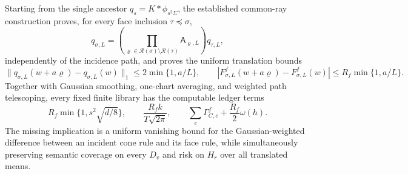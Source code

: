 Starting from the single ancestor \(q_s=K*\phi_{s^2\Sigma}\), the established
common-ray construction proves, for every face inclusion
\(\tau\preceq\sigma\),
\[
 q_{\sigma,L}=
 \left(\prod_{\varrho\in\mathscr R(\sigma)\setminus\mathscr R(\tau)}
 \mathsf A_{\varrho,L}\right)q_{\tau,L},
\]
independently of the incidence path, and proves the uniform translation
bounds
\[
 \|q_{\sigma,L}(w+a\varrho)-q_{\sigma,L}(w)\|_1
 \leq2\min\{1,a/L\},
 \qquad
 |F^f_{\sigma,L}(w+a\varrho)-F^f_{\sigma,L}(w)|
 \leq R_f\min\{1,a/L\}.
\]
Together with Gaussian smoothing, one-chart averaging, and weighted path
telescoping, every fixed finite library has the computable ledger terms
\[
 R_f\min\{1,s^2\sqrt{d/8}\},\qquad
 \frac{R_fk}{T\sqrt{2\pi}},\qquad
 \sum_e\Gamma_{C,e}^f+\frac{R_f}{2}\omega(h).
\]
The missing implication is a uniform vanishing bound for the
Gaussian-weighted difference between an incident cone rule and its face
rule, while simultaneously preserving semantic coverage on every \(D_v\)
and risk on \(H_r\) over all translated means.
